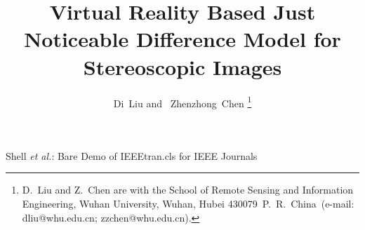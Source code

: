 \documentclass[journal]{IEEEtran}
\begin{document}
%
\title{Virtual Reality Based Just Noticeable Difference Model for Stereoscopic Images}
%
%
%

\author{Di~Liu and ~Zhenzhong~Chen%
\thanks{D.~Liu and Z.~Chen are with the School of Remote Sensing and Information Engineering, Wuhan University, Wuhan, Hubei 430079~P.~R.~China~(e-mail: dliu@whu.edu.cn; zzchen@whu.edu.cn).}%
}

%
%



%
{Shell \MakeLowercase{\textit{et al.}}: Bare Demo of IEEEtran.cls for IEEE Journals}
%
\end{document}

